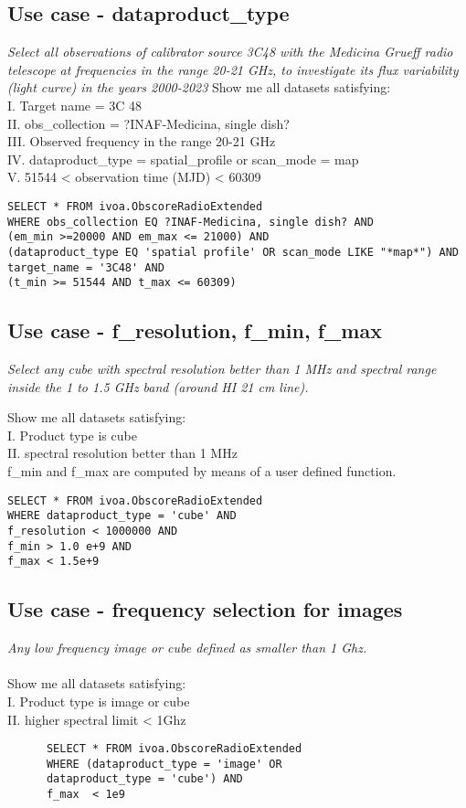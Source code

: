 \subsection{Use case - dataproduct\_type}
\textit{Select all observations of calibrator source 3C48 with the Medicina Grueff radio telescope at frequencies in the range 20-21 GHz, to investigate its flux variability (light curve) in the years 2000-2023}
Show me all datasets satisfying: \\
I. Target name = 3C 48 \\
II. obs\_collection = ?INAF-Medicina, single dish?\\
III. Observed frequency in the range 20-21 GHz \\
IV. dataproduct\_type = spatial\_profile or scan\_mode = map\\
V. 51544 < observation time (MJD) < 60309 \\
\begin{verbatim}
SELECT * FROM ivoa.ObscoreRadioExtended
WHERE obs_collection EQ ?INAF-Medicina, single dish? AND
(em_min >=20000 AND em_max <= 21000) AND
(dataproduct_type EQ 'spatial profile' OR scan_mode LIKE "*map*") AND
target_name = '3C48' AND
(t_min >= 51544 AND t_max <= 60309)
\end{verbatim}

\subsection{Use case - f\_resolution, f\_min, f\_max}
\textit{Select any cube with spectral resolution better than 1 MHz and spectral range inside the 1 to 1.5 GHz band (around HI 21 cm line).}

Show me all datasets satisfying:\\
I. Product type is cube \\
II. spectral resolution better than 1 MHz \\
f\_min and f\_max are computed by means of a user defined function. \\
\begin{verbatim}
SELECT * FROM ivoa.ObscoreRadioExtended
WHERE dataproduct_type = 'cube' AND
f_resolution < 1000000 AND
f_min > 1.0 e+9 AND
f_max < 1.5e+9
\end{verbatim}

\subsection{Use case - frequency selection  for images }
\textit{Any low frequency image or cube  defined as smaller than 1 Ghz.}\\ \\
Show me all datasets satisfying:\\
I. Product type is image or cube \\
II. higher spectral limit < 1Ghz
\begin{verbatim}
      SELECT * FROM ivoa.ObscoreRadioExtended
      WHERE (dataproduct_type = 'image' OR
      dataproduct_type = 'cube') AND
      f_max  < 1e9
\end{verbatim}


